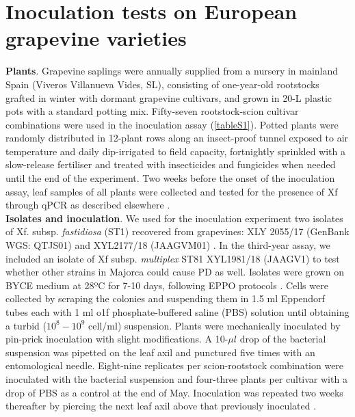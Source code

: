 \section{Inoculation tests on European grapevine
  varieties}\label{app:inoculations}

\textbf{Plants}. Grapevine saplings were annually supplied from a nursery in
mainland Spain (Viveros Villanueva Vides, SL), consisting of one-year-old
rootstocks grafted in winter with dormant grapevine cultivars, and grown in
20-L plastic pots with a standard potting mix. Fifty-seven rootstock-scion
cultivar combinations were used in the inoculation assay (\cref{tableS1}).
Potted plants were randomly distributed in 12-plant rows along an insect-proof
tunnel exposed to air temperature and daily dip-irrigated to field capacity,
fortnightly sprinkled with a slow-release fertiliser and treated with
insecticides and fungicides when needed until the end of the experiment. Two
weeks before the onset of the inoculation assay, leaf samples of all plants
were collected and tested for the presence of Xf through qPCR as described
elsewhere \cite{Moralejo2019}.\\

\noindent\textbf{Isolates and inoculation}. We used for the inoculation
experiment two isolates of Xf. subsp. \textit{fastidiosa} (ST1) recovered from
grapevines: XLY 2055/17 (GenBank WGS: QTJS01) and XYL2177/18 (JAAGVM01)
\cite{Gomila2019,Moralejo2020}. In the third-year assay, we included an isolate
of Xf subsp. \textit{multiplex} ST81 XYL1981/18 (JAAGV1) to test whether
other strains in Majorca could cause PD as well. Isolates were grown on BYCE
medium at 28ºC for 7-10 days, following EPPO protocols \cite{EPPO2018}.  Cells
were collected by scraping the colonies and suspending them in 1.5 ml Eppendorf
tubes each with 1 ml o1f phosphate-buffered saline (PBS) solution until
obtaining a turbid ($10^8-10^9$ cell/ml) suspension. Plants were mechanically
inoculated by pin-prick inoculation \cite{Almeida2003} with slight
modifications. A 10-$\mu l$ drop of the bacterial suspension was pipetted on
the leaf axil and punctured five times with an entomological needle.
Eight-nine replicates per scion-rootstock combination were inoculated with the
bacterial suspension and four-three plants per cultivar with a drop of PBS as a
control at the end of May. Inoculation was repeated two weeks thereafter by
piercing the next leaf axil above that previously inoculated
\cite{Moralejo2019}.\\

